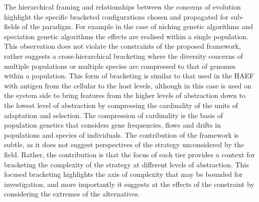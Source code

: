The hierarchical framing and relationships between the concerns of evolution highlight the specific bracketed configurations chosen and propagated for sub-fields of the paradigm. For example in the case of niching genetic algorithms and speciation genetic algorithms the effects are realised within a single population.
This observation does not violate the constraints of the proposed framework, rather suggests a cross-hierarchical bracketing where the diversity concerns of multiple populations or multiple species are compressed to that of genomes within a population. This form of bracketing is similar to that used in the HAEF with antigen from the cellular to the host levels, although in this case is used on the system side to bring features from the higher levels of abstraction down to the lowest level of abstraction by compressing the cardinality of the units of adaptation and selection.
The compression of cardinality is the basis of population genetics that considers gene frequencies, flows and drifts in populations and species of individuals.
The contribution of the framework is subtle, as it does not suggest perspectives of the strategy unconsidered by the field. Rather, the contribution is that the focus of each tier provides a context for bracketing the complexity of the strategy at different levels of abstraction. This focused bracketing highlights the axis of complexity that may be bounded for investigation, and more importantly it suggests at the effects of the constraint by considering the extremes of the alternatives.

%
%
